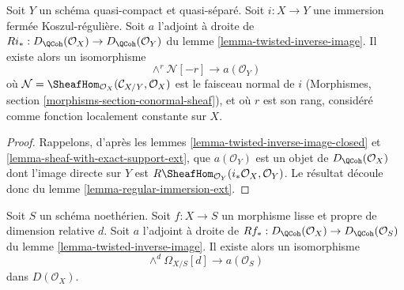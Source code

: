 \begin{lemma}
\label{lemma-regular-immersion}
Soit $Y$ un schéma quasi-compact et quasi-séparé. Soit $i : X \to Y$ une immersion fermée Koszul-régulière. Soit $a$ l'adjoint à droite de $Ri_* : D_\QCoh(\mathcal{O}_X) \to D_\QCoh(\mathcal{O}_Y)$ du lemme \ref{lemma-twisted-inverse-image}. Il existe alors un isomorphisme
$$
\wedge^r\mathcal{N}[-r] \longrightarrow a(\mathcal{O}_Y)
$$
où
$\mathcal{N} = \SheafHom_{\mathcal{O}_X}(\mathcal{C}_{X/Y}, \mathcal{O}_X)$
est le faisceau normal de $i$ (Morphismes, section \ref{morphisms-section-conormal-sheaf}), et où $r$ est son rang, considéré comme fonction localement constante sur $X$.
\end{lemma}

\begin{proof}
Rappelons, d'après les lemmes \ref{lemma-twisted-inverse-image-closed} et \ref{lemma-sheaf-with-exact-support-ext}, que $a(\mathcal{O}_Y)$ est un objet de $D_\QCoh(\mathcal{O}_X)$ dont l'image directe sur $Y$ est $R\SheafHom_{\mathcal{O}_Y}(i_*\mathcal{O}_X, \mathcal{O}_Y)$. Le résultat découle donc du lemme \ref{lemma-regular-immersion-ext}.
\end{proof}

\begin{lemma}
\label{lemma-smooth-proper}
Soit $S$ un schéma noethérien. Soit $f : X \to S$ un morphisme lisse et propre de dimension relative $d$. Soit $a$ l'adjoint à droite de $Rf_* : D_\QCoh(\mathcal{O}_X) \to D_\QCoh(\mathcal{O}_S)$ du lemme \ref{lemma-twisted-inverse-image}. Il existe alors un isomorphisme
$$
\wedge^d \Omega_{X/S}[d] \longrightarrow a(\mathcal{O}_S)
$$
dans $D(\mathcal{O}_X)$.
\end{lemma}

